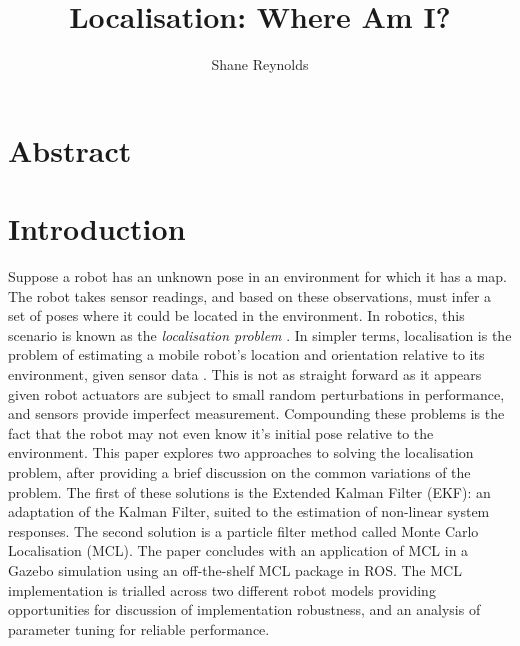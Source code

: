 \documentclass[a4paper]{article}
\begin{document}
\title{Localisation: Where Am I?}
\author{Shane Reynolds}
\maketitle

\section*{Abstract}

\section{Introduction}
Suppose a robot has an unknown pose in an environment for which it has a map. The robot takes sensor readings, and based on these observations, must infer a set of poses where it could be located in the environment. In robotics, this scenario is known as the \textit{localisation problem} \cite{Cox:1991, Wang:1988}. In simpler terms, localisation is the problem of estimating a mobile robot's location and orientation relative to its environment, given sensor data \cite{Thrun:2001}. This is not as straight forward as it appears given robot actuators are subject to small random perturbations in performance, and sensors provide imperfect measurement. Compounding these problems is the fact that the robot may not even know it's initial pose relative to the environment. This paper explores two approaches to solving the localisation problem, after providing a brief discussion on the common variations of the problem. The first of these solutions is the Extended Kalman Filter (EKF): an adaptation of the Kalman Filter, suited to the estimation of non-linear system responses. The second solution is a particle filter method called Monte Carlo Localisation (MCL). The paper concludes with an application of MCL in a Gazebo simulation using an off-the-shelf MCL package in ROS. The MCL implementation is trialled across two different robot models providing opportunities for discussion of implementation robustness, and an analysis of parameter tuning for reliable performance.
\end{document}
